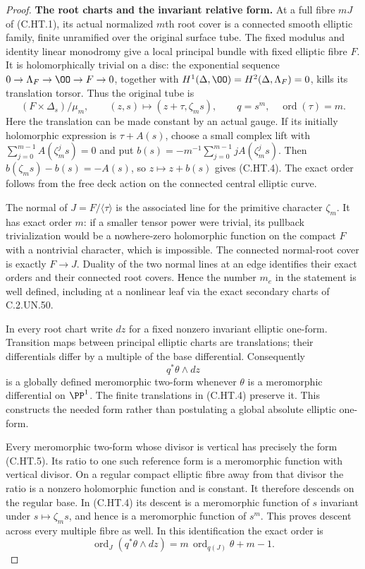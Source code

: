 \begin{proof}
\par\medskip\noindent\textbf{The root charts and the invariant relative form.}
At a full fibre $mJ$ of (C.HT.1), its actual normalized $m$th root
cover is a connected smooth elliptic family, finite unramified over
the original surface tube. The fixed modulus and identity linear
monodromy give a local principal bundle with fixed elliptic fibre
$F$. It is holomorphically trivial on a disc: the exponential
sequence $0\to\Lambda_F\to\OO\to F\to0$, together with
$H^1(\Delta,\OO)=H^2(\Delta,\Lambda_F)=0$, kills its translation
torsor. Thus the original tube is
\[
       (F\times\Delta_s)/\mu_m,\qquad
       (z,s)\longmapsto(z+\tau,\zeta_m s),\qquad
       q=s^m,\quad \operatorname{ord}(\tau)=m.          \tag{C.HT.4}
\]
Here the translation can be made constant by an actual gauge.
If its initially holomorphic expression is $\tau+A(s)$, choose a
small complex lift with $\sum_{j=0}^{m-1}A(\zeta_m^j s)=0$ and put
$b(s)=-m^{-1}\sum_{j=0}^{m-1}jA(\zeta_m^j s)$.
Then $b(\zeta_ms)-b(s)=-A(s)$, so $z\mapsto z+b(s)$ gives (C.HT.4).
The exact order follows from the free deck action on the connected
central elliptic curve.

The normal of $J=F/\langle\tau\rangle$ is the associated line for
the primitive character $\zeta_m$. It has exact order $m$:
if a smaller tensor power were trivial, its pullback trivialization
would be a nowhere-zero holomorphic function on the compact $F$
with a nontrivial character, which is impossible. The connected
normal-root cover is exactly $F\to J$. Duality of the two normal
lines at an edge identifies their exact orders and their connected
root covers. Hence the number $m_e$ in the statement is well defined,
including at a nonlinear leaf via the exact secondary charts of
C.2.UN.50.

In every root chart write $dz$ for a fixed nonzero invariant
elliptic one-form. Transition maps between principal elliptic
charts are translations; their differentials differ by a multiple
of the base differential. Consequently
\[
                         q^*\theta\wedge dz             \tag{C.HT.5}
\]
is a globally defined meromorphic two-form whenever $\theta$ is a
meromorphic differential on $\PP^1$. The finite translations in
(C.HT.4) preserve it. This constructs the needed form rather than
postulating a global absolute elliptic one-form.

Every meromorphic two-form whose divisor is vertical has precisely
the form (C.HT.5). Its ratio to one such reference form is a
meromorphic function with vertical divisor. On a regular compact
elliptic fibre away from that divisor the ratio is a nonzero
holomorphic function and is constant. It therefore descends on
the regular base. In (C.HT.4) its descent is a meromorphic function
of $s$ invariant under $s\mapsto\zeta_ms$, and hence is a
meromorphic function of $s^m$. This proves descent across every
multiple fibre as well. In this identification the exact order is
\[
 \operatorname{ord}_J(q^*\theta\wedge dz)
               =m\,\operatorname{ord}_{q(J)}\theta+m-1 .
                                                        \tag{C.HT.6}
\]


\end{proof}
